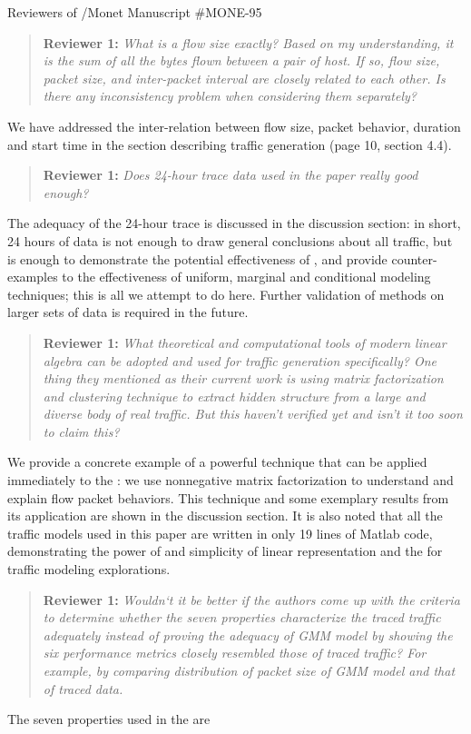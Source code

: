 \documentclass{letter}
\newenvironment{reviewer}[1]%
{\begin{quote}\textbf{Reviewer #1:} \it}{\end{quote}}
\begin{document}
\begin{letter}{Reviewers of /Monet Manuscript \#MONE-95}
\begin{reviewer}{1}
What is a flow size exactly? Based on my understanding, it is the sum of all the bytes ﬂown between a pair of host. If so, flow size, packet size, and inter-packet interval are closely related to each other. Is there any inconsistency problem when considering them separately?
\end{reviewer}
We have addressed the inter-relation between flow size, packet behavior, duration and start time in the section describing traffic generation (page 10, section 4.4).

\begin{reviewer}{1}
Does 24-hour trace data used in the paper really good enough?
\end{reviewer}
The adequacy of the 24-hour trace is discussed in the discussion section: in short, 24 hours of data is not enough to draw general conclusions about all traffic, but is enough to demonstrate the potential effectiveness of , and provide counter-examples to the effectiveness of uniform, marginal and conditional modeling techniques;
this is all we attempt to do here.
Further validation of methods on larger sets of data is required in the future.

\begin{reviewer}{1}
What theoretical and computational tools of modern linear algebra can be adopted and used for traffic generation specifically? One thing they mentioned as their current work is using matrix factorization and clustering technique to extract hidden structure from a large and diverse body of real traffic. But this haven’t verified yet and isn’t it too soon to claim this?
\end{reviewer}
We provide a concrete example of a powerful technique that can be applied immediately to the : we use nonnegative matrix factorization to understand and explain flow packet behaviors.
This technique and some exemplary results from its application are shown in the discussion section.
It is also noted that all the traffic models used in this paper are written in only 19 lines of Matlab code, demonstrating the power of and simplicity of linear representation and the  for traffic modeling explorations.

\begin{reviewer}{1}
Wouldn‘t it be better if the authors come up with the criteria to determine whether the seven properties characterize the traced traffic adequately instead of proving the adequacy of GMM model by showing the six performance metrics closely resembled those of traced traffic? For example, by comparing distribution of packet size of GMM model and that of traced data.
\end{reviewer}
The seven properties used in the  are %


\end{letter}
\end{document}
